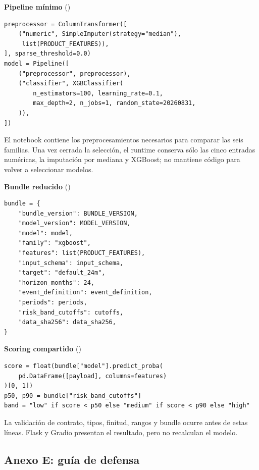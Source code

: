 \documentclass[10pt,a4paper]{article}
\begin{document}
\textbf{Pipeline mínimo} ()

{\scriptsize
\begin{verbatim}
preprocessor = ColumnTransformer([
    ("numeric", SimpleImputer(strategy="median"),
     list(PRODUCT_FEATURES)),
], sparse_threshold=0.0)
model = Pipeline([
    ("preprocessor", preprocessor),
    ("classifier", XGBClassifier(
        n_estimators=100, learning_rate=0.1,
        max_depth=2, n_jobs=1, random_state=20260831,
    )),
])
\end{verbatim}}

El notebook contiene los preprocesamientos necesarios para comparar las seis
familias. Una vez cerrada la selección, el runtime conserva sólo las cinco
entradas numéricas, la imputación por mediana y XGBoost; no mantiene código para
volver a seleccionar modelos.

\textbf{Bundle reducido} ()

{\scriptsize
\begin{verbatim}
bundle = {
    "bundle_version": BUNDLE_VERSION,
    "model_version": MODEL_VERSION,
    "model": model,
    "family": "xgboost",
    "features": list(PRODUCT_FEATURES),
    "input_schema": input_schema,
    "target": "default_24m",
    "horizon_months": 24,
    "event_definition": event_definition,
    "periods": periods,
    "risk_band_cutoffs": cutoffs,
    "data_sha256": data_sha256,
}
\end{verbatim}}

\textbf{Scoring compartido} ()

{\scriptsize
\begin{verbatim}
score = float(bundle["model"].predict_proba(
    pd.DataFrame([payload], columns=features)
)[0, 1])
p50, p90 = bundle["risk_band_cutoffs"]
band = "low" if score < p50 else "medium" if score < p90 else "high"
\end{verbatim}}

La validación de contrato, tipos, finitud, rangos y bundle ocurre antes de estas
líneas. Flask y Gradio presentan el resultado, pero no recalculan el modelo.

\subsection{Anexo E: guía de defensa}
\end{document}
